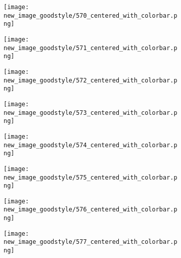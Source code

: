 \documentclass[a4paper,12pt]{article}
\begin{document}
\begin{figure}[H]
  \begin{subfigure}{0.11\textwidth}
    \texttt{[image: new\_image\_goodstyle/570\_centered\_with\_colorbar.png]}
  \end{subfigure}
  \hfill
  \begin{subfigure}{0.11\textwidth}
    \texttt{[image: new\_image\_goodstyle/571\_centered\_with\_colorbar.png]}
  \end{subfigure}
  \hfill
  \begin{subfigure}{0.11\textwidth}
    \texttt{[image: new\_image\_goodstyle/572\_centered\_with\_colorbar.png]}
  \end{subfigure}
  \hfill
  \begin{subfigure}{0.11\textwidth}
    \texttt{[image: new\_image\_goodstyle/573\_centered\_with\_colorbar.png]}
  \end{subfigure}
  \hfill
  \begin{subfigure}{0.11\textwidth}
    \texttt{[image: new\_image\_goodstyle/574\_centered\_with\_colorbar.png]}
  \end{subfigure}
  \hfill
  \begin{subfigure}{0.11\textwidth}
    \texttt{[image: new\_image\_goodstyle/575\_centered\_with\_colorbar.png]}
  \end{subfigure}
  \hfill
  \begin{subfigure}{0.11\textwidth}
    \texttt{[image: new\_image\_goodstyle/576\_centered\_with\_colorbar.png]}
  \end{subfigure}
  \hfill
  \begin{subfigure}{0.11\textwidth}
    \texttt{[image: new\_image\_goodstyle/577\_centered\_with\_colorbar.png]}
  \end{subfigure}
  \hfill
\end{figure}
\end{document}
